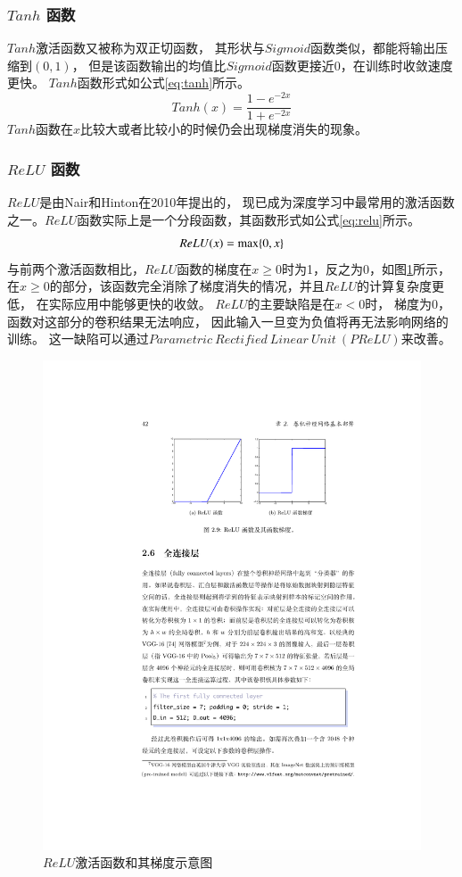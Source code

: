 \subsubsection{$Tanh$ 函数}

$Tanh$激活函数又被称为双正切函数，
其形状与$Sigmoid$函数类似，都能将输出压缩到$(0,1)$，
但是该函数输出的均值比$Sigmoid$函数更接近0，在训练时收敛速度更快。
$Tanh$函数形式如公式\eqref{eq:tanh}所示。
\begin{equation}
Tanh⁡(x)=\frac{1-e^{-2x}}{1+e^{-2x}}
\label{eq:tanh}
\end{equation}
$Tanh$函数在$x$比较大或者比较小的时候仍会出现梯度消失的现象。


\subsubsection{$ReLU$ 函数}

$ReLU$\cite{nair2010rectified}是由Nair和Hinton在2010年提出的，
现已成为深度学习中最常用的激活函数之一。$ReLU$函数实际上是一个分段函数，其函数形式如公式\eqref{eq:relu}所示。
\begin{equation}
\centering
ReLU(x)=\max\{0,x\}
\label{eq:relu}
\end{equation}
与前两个激活函数相比，$ReLU$函数的梯度在$x\geq 0$时为1，反之为0，如图\ref{fig:relu}所示，
在$x\geq 0$的部分，该函数完全消除了梯度消失的情况，并且$ReLU$的计算复杂度更低，
在实际应用中能够更快的收敛。
$ReLU$的主要缺陷是在$x<0$时，
梯度为0，函数对这部分的卷积结果无法响应，
因此输入一旦变为负值将再无法影响网络的训练。
这一缺陷可以通过$Parametric~Rectified~Linear~Unit~(PReLU)$\cite{he2015delving}来改善。
\begin{figure}[htbp]
\centering
\includegraphics[width=0.7\linewidth]{figures/RELU.pdf}
\caption{$ReLU$激活函数和其梯度示意图}
\label{fig:relu}
\end{figure}

